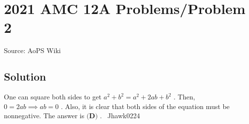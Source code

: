 \documentclass[12pt]{article}
\begin{document}
\section*{{2021 AMC 12A Problems/Problem 2}}
Source: AoPS Wiki

\subsection*{Solution}
One can square both sides to get $a^{2}+b^{2}=a^{2}+2ab+b^{2}$ . Then, $0=2ab\implies ab=0$ . Also, it is clear that both sides of the equation must be nonnegative. The answer is $\boxed{\textbf{(D)}}$ . ~Jhawk0224
\end{document}
